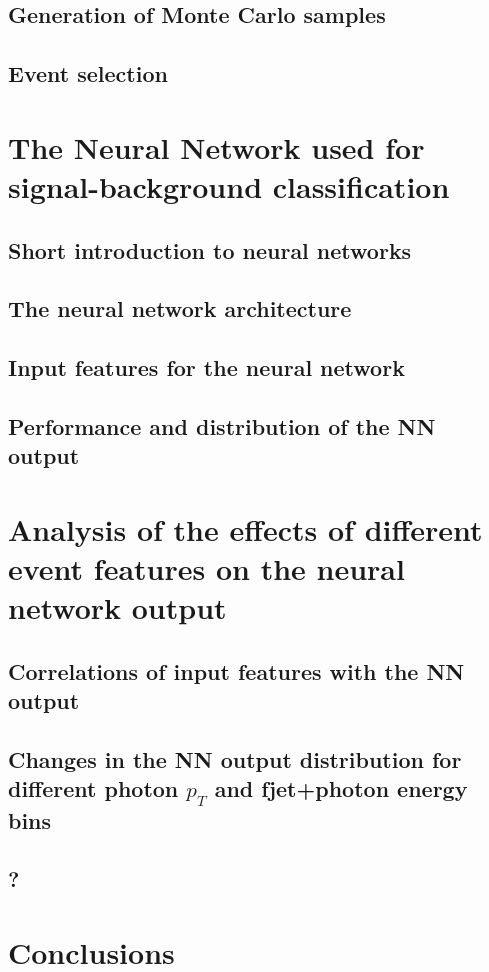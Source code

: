\section{Generation of Monte Carlo samples}
\section{Event selection}
\chapter{The Neural Network used for signal-background classification}
\section{Short introduction to neural networks}
\section{The neural network architecture}
\section{Input features for the neural network}
\section{Performance and distribution of the NN output}
\chapter{Analysis of the effects of different event features on the neural network output}
\section{Correlations of input features with the NN output}
\section{Changes in the NN output distribution for different photon \texorpdfstring{$p_T$}{TEXT} and fjet+photon energy bins}
\section{?}
\chapter{Conclusions}